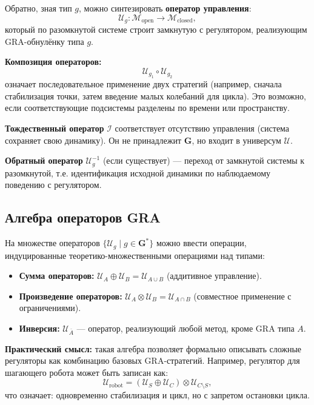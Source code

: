 \documentclass[12pt,a4paper]{article}
\newcommand{\G}{\mathbf{G}}
\newcommand{\U}{\mathcal{U}}
\newcommand{\M}{\mathcal{M}}
\newcommand{\I}{\mathcal{I}}
\begin{document}
Обратно, зная тип $g$, можно синтезировать \textbf{оператор управления}:
\begin{equation}
    \U_g : \M_{\text{open}} \to \M_{\text{closed}},
\end{equation}
который по разомкнутой системе строит замкнутую с регулятором, реализующим GRA-обнулёнку типа $g$.

\textbf{Композиция операторов:}
\begin{equation}
    \U_{g_1} \circ \U_{g_2}
\end{equation}
означает последовательное применение двух стратегий (например, сначала стабилизация точки, затем введение малых колебаний для цикла). Это возможно, если соответствующие подсистемы разделены по времени или пространству.

\textbf{Тождественный оператор} $\I$ соответствует отсутствию управления (система сохраняет свою динамику). Он не принадлежит $\G$, но входит в универсум $\U$.

\textbf{Обратный оператор} $\U_g^{-1}$ (если существует) — переход от замкнутой системы к разомкнутой, т.е. идентификация исходной динамики по наблюдаемому поведению с регулятором.

\subsection{Алгебра операторов GRA}

На множестве операторов $\{\U_g \mid g \in \G^*\}$ можно ввести операции, индуцированные теоретико-множественными операциями над типами:

\begin{itemize}
    \item \textbf{Сумма операторов:} $\U_A \oplus \U_B = \U_{A \cup B}$ (аддитивное управление).
    \item \textbf{Произведение операторов:} $\U_A \otimes \U_B = \U_{A \cap B}$ (совместное применение с ограничениями).
    \item \textbf{Инверсия:} $\U_{\overline{A}}$ — оператор, реализующий любой метод, кроме GRA типа $A$.
\end{itemize}

\textbf{Практический смысл:} такая алгебра позволяет формально описывать сложные регуляторы как комбинацию базовых GRA-стратегий. Например, регулятор для шагающего робота может быть записан как:
\begin{equation}
    \U_{\text{robot}} = (\U_S \oplus \U_C) \otimes \U_{C \setminus S},
\end{equation}
что означает: одновременно стабилизация и цикл, но с запретом остановки цикла.
\end{document}
